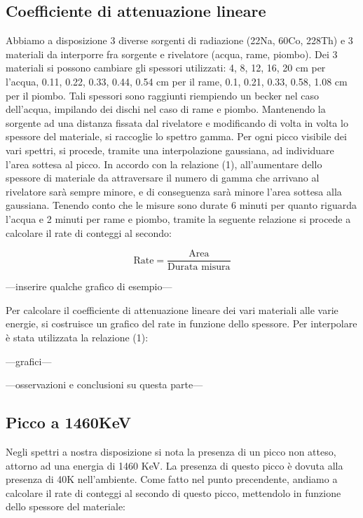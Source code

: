 \documentclass[a4paper,10pt]{article}
\begin{document}
\subsection{Coefficiente di attenuazione lineare}
Abbiamo a disposizione 3 diverse sorgenti di radiazione (22Na, 60Co, 228Th) e 3 materiali da interporre fra sorgente e rivelatore (acqua, rame, piombo). Dei 3 materiali si possono cambiare gli spessori utilizzati: 4, 8, 12, 16, 20 cm per l'acqua, 0.11, 0.22, 0.33, 0.44, 0.54 cm per il rame, 0.1, 0.21, 0.33, 0.58, 1.08 cm per il piombo. Tali spessori sono raggiunti riempiendo un becker nel caso dell'acqua, impilando dei dischi nel caso di rame e piombo. Mantenendo la sorgente ad una distanza fissata dal rivelatore e modificando di volta in volta lo spessore del materiale, si raccoglie lo spettro gamma. Per ogni picco visibile dei vari spettri, si procede, tramite una interpolazione gaussiana, ad individuare l'area sottesa al picco. In accordo con la relazione (1), all'aumentare dello spessore di materiale da attraversare il numero di gamma che arrivano al rivelatore sarà sempre minore, e di conseguenza sarà minore l'area sottesa alla gaussiana. Tenendo conto che le misure sono durate 6 minuti per quanto riguarda l'acqua e 2 minuti per rame e piombo, tramite la seguente relazione si procede a calcolare il rate di conteggi al secondo:

\begin{equation}
	\textrm{Rate} = \frac{\textrm{Area}}{\textrm{Durata  misura}}
\end{equation}

---inserire qualche grafico di esempio---

Per calcolare il coefficiente di attenuazione lineare dei vari materiali alle varie energie, si costruisce un grafico del rate in funzione dello spessore. Per interpolare è stata utilizzata la relazione (1):

---grafici---

---osservazioni e conclusioni su questa parte---

\subsection{Picco a 1460KeV}

Negli spettri a nostra disposizione si nota la presenza di un picco non atteso, attorno ad una energia di 1460 KeV. La presenza di questo picco è dovuta alla presenza di 40K nell'ambiente. Come fatto nel punto precendente, andiamo a calcolare il rate di conteggi al secondo di questo picco, mettendolo in funzione dello spessore del materiale:
\end{document}
